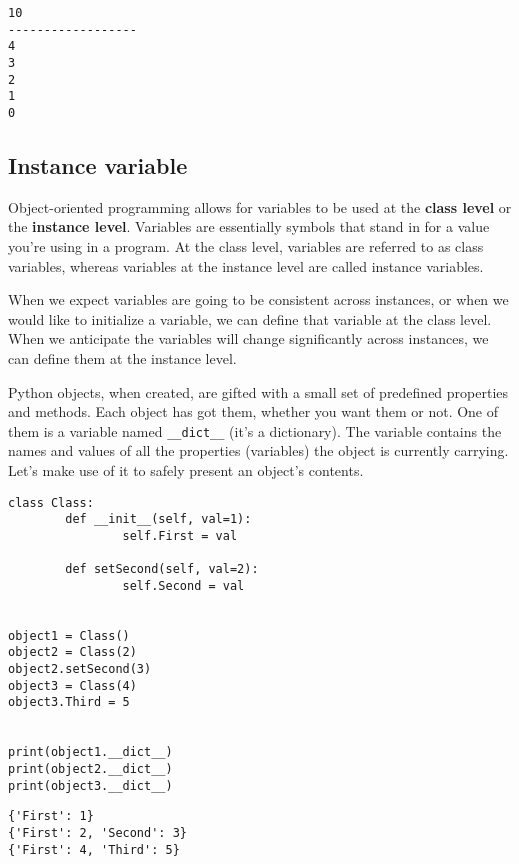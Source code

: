 \documentclass[11pt]{article}
\begin{document}
\begin{verbatim}
10
------------------
4
3
2
1
0
\end{verbatim}

\subsection{Instance variable}
\label{sec:org5933753}
Object-oriented programming allows for variables to be used at the
\textbf{class level} or the \textbf{instance level}. Variables are essentially
symbols that stand in for a value you’re using in a program. At the
class level, variables are referred to as class variables, whereas
variables at the instance level are called instance variables.

When we expect variables are going to be consistent across instances,
or when we would like to initialize a variable, we can define that
variable at the class level. When we anticipate the variables will
change significantly across instances, we can define them at the
instance level.

Python objects, when created, are gifted with a small set of
predefined properties and methods. Each object has got them, whether
you want them or not. One of them is a variable named \texttt{\_\_dict\_\_} (it’s a
dictionary).  The variable contains the names and values of all the
properties (variables) the object is currently carrying. Let’s make
use of it to safely present an object’s contents.

\begin{verbatim}
class Class:
        def __init__(self, val=1):
                self.First = val

        def setSecond(self, val=2):
                self.Second = val


object1 = Class()
object2 = Class(2)
object2.setSecond(3)
object3 = Class(4)
object3.Third = 5


print(object1.__dict__)
print(object2.__dict__)
print(object3.__dict__)
\end{verbatim}

\begin{verbatim}
{'First': 1}
{'First': 2, 'Second': 3}
{'First': 4, 'Third': 5}
\end{verbatim}
\end{document}
